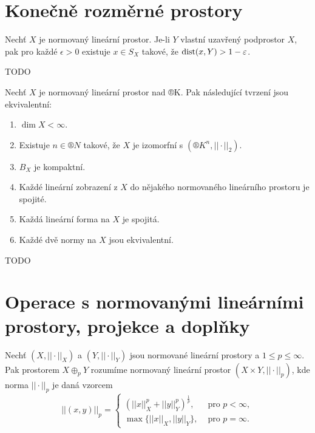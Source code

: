 \documentclass[12pt]{article}					%
\begin{document}
\section{Konečně rozměrné prostory}
\begin{lemma}
	Nechť $X$ je normovaný lineární prostor. Je-li $Y$ vlastní uzavřený podprostor $X$, pak pro každé $\epsilon > 0$ existuje $x \in S_X$ takové, že $\operatorname{dist}(x, Y) > 1 - \varepsilon$.

	\begin{dukazin}
		TODO
	\end{dukazin}
\end{lemma}

\begin{veta}
	Nechť $X$ je normovaný lineární prostor nad ®K. Pak následující tvrzení jsou ekvivalentní:
	
	\begin{enumerate}
		\item $\dim X < ∞$.
		\item Existuje $n \in ®N$ takové, že $X$ je izomorfní s $(®K^n, ||·||_2)$.
		\item $B_X$ je kompaktní.
		\item Každé lineární zobrazení z $X$ do nějakého normovaného lineárního prostoru je spojité.
		\item Každá lineární forma na $X$ je spojitá.
		\item Každé dvě normy na $X$ jsou ekvivalentní.
	\end{enumerate}

	\begin{dukazin}
		TODO
	\end{dukazin}
\end{veta}

\section{Operace s normovanými lineárními prostory, projekce a doplňky}
\begin{definice}
	Nechť $(X, ||·||_X)$ a $(Y, ||·||_Y)$ jsou normované lineární prostory a $1 ≤ p ≤ ∞$. Pak prostorem $X \oplus_p Y$ rozumíme normovaný lineární prostor $(X \times Y, ||·||_p)$, kde norma $||·||_p$ je daná vzorcem
	$$ ||(x, y)||_p = \begin{cases}(||x||^p_X + ||y||^p_Y)^{\frac{1}{p}}, & \text{ pro } p < ∞, \\ \max\{||x||_X, ||y||_Y\}, & \text{ pro } p = ∞.\end{cases} $$
\end{definice}
\end{document}

